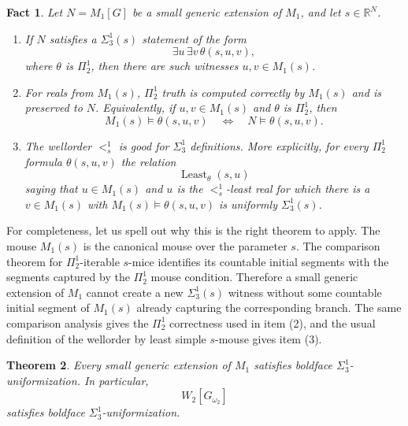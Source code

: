 \documentclass[a4paper,11pt]{article}
\newtheorem{theorem}{Theorem}[section]
\newtheorem{fact}[theorem]{Fact}
\begin{document}
\begin{fact}\label{fact:m1-capture-and-good-wellorder}
Let $N=M_1[G]$ be a small generic extension of $M_1$, and let $s\in\mathbb R^N$.

\begin{enumerate}
    \item If $N$ satisfies a $\Sigma^1_3(s)$ statement of the form
    \[
       \exists u\,\exists v\,\theta(s,u,v),
    \]
    where $\theta$ is $\Pi^1_2$, then there are such witnesses $u,v\in M_1(s)$.

    \item For reals from $M_1(s)$, $\Pi^1_2$ truth is computed correctly by $M_1(s)$ and is preserved to $N$.  Equivalently, if $u,v\in M_1(s)$ and $\theta$ is $\Pi^1_2$, then
    \[
       M_1(s)\models\theta(s,u,v)
       \quad\Longleftrightarrow\quad
       N\models\theta(s,u,v).
    \]

    \item The wellorder $<^1_s$ is good for $\Sigma^1_3$ definitions.  More explicitly, for every $\Pi^1_2$ formula $\theta(s,u,v)$ the relation
    \[
       \operatorname{Least}_{\theta}(s,u)
    \]
    saying that $u\in M_1(s)$ and $u$ is the $<^1_s$-least real for which there is a $v\in M_1(s)$ with $M_1(s)\models\theta(s,u,v)$ is uniformly $\Sigma^1_3(s)$.
\end{enumerate}
\end{fact}

For completeness, let us spell out why this is the right theorem to apply.  The mouse $M_1(s)$ is the canonical mouse over the parameter $s$.  The comparison theorem for $\Pi^1_2$-iterable $s$-mice identifies its countable initial segments with the segments captured by the $\Pi^1_2$ mouse condition.  Therefore a small generic extension of $M_1$ cannot create a new $\Sigma^1_3(s)$ witness without some countable initial segment of $M_1(s)$ already capturing the corresponding branch.  The same comparison analysis gives the $\Pi^1_2$ correctness used in item (2), and the usual definition of the wellorder by least simple $s$-mouse gives item (3).

\begin{theorem}\label{thm:sigma13-uniformization-m1-generic}
Every small generic extension of $M_1$ satisfies boldface $\Sigma^1_3$-uniformization.  In particular,
\[
   W_2[G_{\omega_2}]
\]
satisfies boldface $\Sigma^1_3$-uniformization.
\end{theorem}
\end{document}

